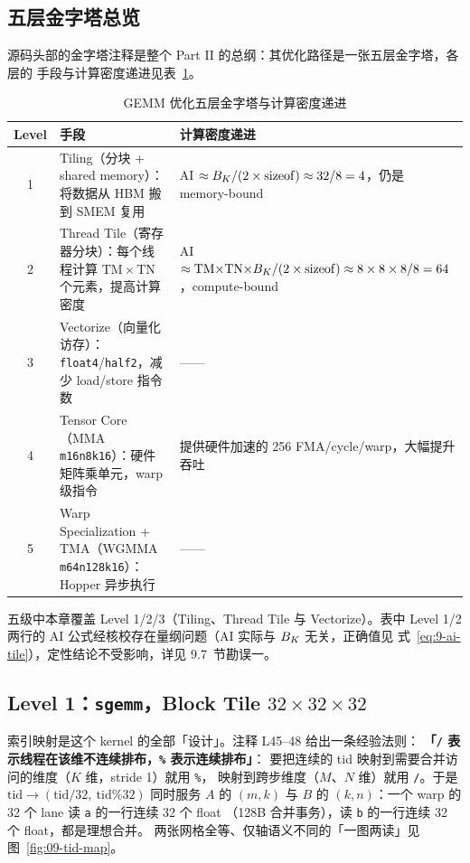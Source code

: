 \subsection{五层金字塔总览}

源码头部的金字塔注释是整个 Part II 的总纲：其优化路径是一张五层金字塔，各层的
手段与计算密度递进见表~\ref{tab:9-pyramid}。

\begin{table}[htbp]
\centering
\caption{GEMM 优化五层金字塔与计算密度递进}
\label{tab:9-pyramid}
\begin{tabular}{cp{}p{}}
\toprule
Level & 手段 & 计算密度递进 \\
\midrule
1 & Tiling（分块 + shared memory）：将数据从 HBM 搬到 SMEM 复用 &
  AI $\approx B\sb{K}/(2\times\mathrm{sizeof}) \approx 32/8 = 4$，仍是 memory-bound \\
2 & Thread Tile（寄存器分块）：每个线程计算 $\mathrm{TM}\times\mathrm{TN}$ 个元素，提高计算密度 &
  AI $\approx \mathrm{TM}{\times}\mathrm{TN}{\times}B\sb{K}/(2\times\mathrm{sizeof}) \approx 8\times8\times8/8 = 64$，compute-bound \\
3 & Vectorize（向量化访存）：\texttt{float4}/\texttt{half2}，减少 load/store 指令数 & —— \\
4 & Tensor Core（MMA \texttt{m16n8k16}）：硬件矩阵乘单元，warp 级指令 &
  提供硬件加速的 256 FMA/cycle/warp，大幅提升吞吐 \\
5 & Warp Specialization + TMA（WGMMA \texttt{m64n128k16}）：Hopper 异步执行 & —— \\
\bottomrule
\end{tabular}
\end{table}

五级中本章覆盖 Level 1/2/3（Tiling、Thread Tile 与 Vectorize）。表中
Level 1/2 两行的 AI 公式经核校存在量纲问题（AI 实际与 $B\sb{K}$ 无关，正确值见
式~\ref{eq:9-ai-tile}），定性结论不受影响，详见 9.7~节勘误一。

\subsection{Level 1：\texttt{sgemm}，Block Tile $32 \times 32 \times 32$}



索引映射是这个 kernel 的全部「设计」。注释 L45--48 给出一条经验法则：
\textbf{「\texttt{/} 表示线程在该维不连续排布，\texttt{\%} 表示连续排布」}：
要把连续的 tid 映射到需要合并访问的维度（$K$ 维，stride 1）就用 \texttt{\%}，
映射到跨步维度（$M$、$N$ 维）就用 \texttt{/}。于是
$\mathrm{tid} \to (\mathrm{tid}/32,\ \mathrm{tid}\%32)$ 同时服务 $A$ 的 $(m, k)$ 与
$B$ 的 $(k, n)$：一个 warp 的 32 个 lane 读 \texttt{a} 的一行连续 32 个 float
（128B 合并事务），读 \texttt{b} 的一行连续 32 个 float，都是理想合并。
两张网格全等、仅轴语义不同的「一图两读」见图~\ref{fig:09-tid-map}。

